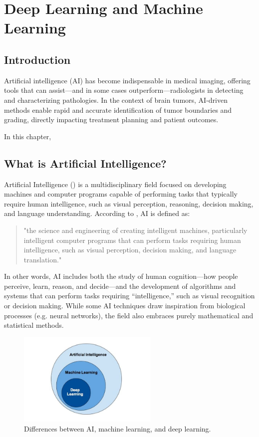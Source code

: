 \chapter{Deep Learning and Machine Learning}

\section{Introduction}
\label{sec:intro}
Artificial intelligence (AI) has become indispensable in medical imaging, offering tools that can assist—and in some cases outperform—radiologists in detecting and characterizing pathologies. In the context of brain tumors, AI-driven methods enable rapid and accurate identification of tumor boundaries and grading, directly impacting treatment planning and patient outcomes.

In this chapter,


\section{What is Artificial Intelligence?}

Artificial Intelligence () is a multidisciplinary field focused on developing machines and computer programs capable of performing tasks that typically require human intelligence, such as visual perception, reasoning, decision making, and language understanding. According to \cite{sciencedirect_ai_overview}, AI is defined as:

\begin{quotation}
  "the science and engineering of creating intelligent machines, particularly intelligent computer programs that can perform tasks requiring human intelligence, such as visual perception, decision making, and language translation."
\end{quotation}

In other words, AI includes both the study of human cognition—how people perceive, learn, reason, and decide—and the development of algorithms and systems that can perform tasks requiring “intelligence,” such as visual recognition or decision making. While some AI techniques draw inspiration from biological processes (e.g. neural networks), the field also embraces purely mathematical and statistical methods.

\begin{figure}[H]
  \centering
  \includegraphics[width=0.6\textwidth]{Images/Chapter1/ai.jpg}
  \caption{Differences between AI, machine learning, and deep learning. \cite{thakkar2020aivsmlvsdl}}
  \label{fig:ai}
\end{figure}

